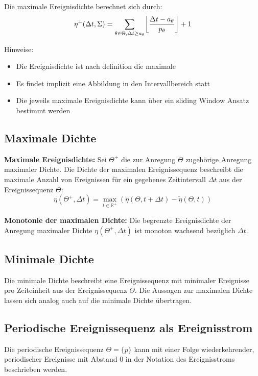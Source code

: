 Die maximale Ereignisdichte berechnet sich durch:
\begin{equation}
    \eta^+(\Delta t, \Sigma) = \sum_{\theta \in \Theta, \Delta t \geq a_\theta}
        \floor*{\frac{\Delta t - a_\theta}{p_\theta}} + 1
\end{equation}

Hinweise:
\begin{itemize}
    \item Die Ereignisdichte ist nach definition die maximale
    \item Es findet implizit eine Abbildung in den Intervallbereich statt
    \item Die jeweils maximale Ereignisdichte kann über ein sliding Window
        Ansatz bestimmt werden
\end{itemize}

\subsection{Maximale Dichte}
\begin{tcolorbox}
    \textbf{Maximale Ereignisdichte: } Sei $\Theta^+$ die zur Anregung $\Theta$
    zugehörige Anregung maximaler Dichte. Die Dichte der maximalen Ereignissequenz
    beschreibt die maximale Anzahl von Ereignissen für ein gegebenes Zeitintervall
    $\Delta t$ aus der Ereignissequenz $\Theta$:
    \begin{equation}
        \eta(\Theta^+, \Delta t) = \max_{t \in \mathbb{R}^+} \left(
        \eta(\Theta, t + \Delta t) - \check{\eta}(\Theta, t)
        \right)
    \end{equation}
\end{tcolorbox}

\begin{tcolorbox}
    \textbf{Monotonie der maximalen Dichte: } Die begrenzte Ereignisdichte der Anregung
    maximaler Dichte $\eta(\Theta^+, \Delta t)$ ist monoton wachsend bezüglich
    $\Delta t$.
\end{tcolorbox}

\subsection{Minimale Dichte}
Die minimale Dichte beschreibt eine Ereignissequenz mit minimaler Ereignisse
pro Zeiteinheit aus der Ereignissequenz $\Theta$. Die Aussagen zur maximalen Dichte
lassen sich analog auch auf die minimale Dichte übertragen.

\subsection{Periodische Ereignissequenz als Ereignisstrom}
Die periodische Ereignissequenz $\Theta = \{p\}$ kann mit einer Folge wiederkehrender,
periodischer Ereignisse mit Abstand $0$ in der Notation des Ereignisstroms beschrieben
werden.

